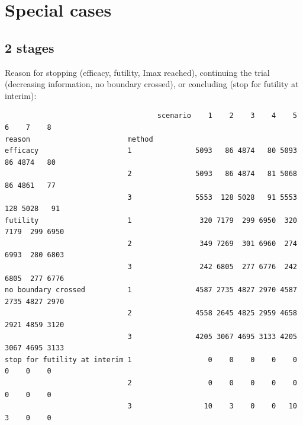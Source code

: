 \documentclass[12pt]{article}
\begin{document}
\clearpage

\section{Special cases}
\label{sec:orgc129d67}

\subsection{2 stages}
\label{sec:org4c0f4a6}

Reason for stopping (efficacy, futility, Imax reached), continuing the
trial (decreasing information, no boundary crossed), or concluding
(stop for futility at interim):
\begin{verbatim}
                                    scenario    1    2    3    4    5    6    7    8
reason                       method                                                 
efficacy                     1               5093   86 4874   80 5093   86 4874   80
                             2               5093   86 4874   81 5068   86 4861   77
                             3               5553  128 5028   91 5553  128 5028   91
futility                     1                320 7179  299 6950  320 7179  299 6950
                             2                349 7269  301 6960  274 6993  280 6803
                             3                242 6805  277 6776  242 6805  277 6776
no boundary crossed          1               4587 2735 4827 2970 4587 2735 4827 2970
                             2               4558 2645 4825 2959 4658 2921 4859 3120
                             3               4205 3067 4695 3133 4205 3067 4695 3133
stop for futility at interim 1                  0    0    0    0    0    0    0    0
                             2                  0    0    0    0    0    0    0    0
                             3                 10    3    0    0   10    3    0    0
\end{verbatim}
\end{document}
